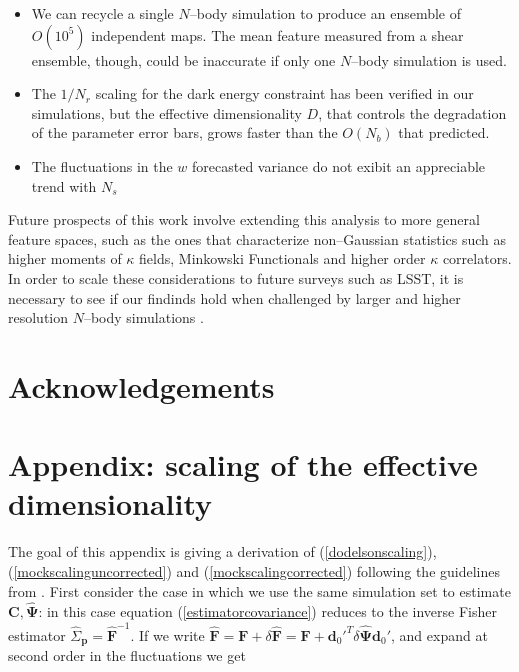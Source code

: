 \documentclass[reprint,aps,prd,superscriptaddress,showkeys,showpacs]{revtex4-1}
\newcommand{\bb}[1]{\mathbf{#1}}
\newcommand{\bbh}[1]{\mathbf{\hat{#1}}}
\newcommand{\h}[1]{\hat{#1}}
\begin{document}
\begin{itemize}
\item We can recycle a single $N$--body simulation to produce an ensemble of $O(10^5)$ independent maps. The mean feature measured from a shear ensemble, though, could be inaccurate if only one $N$--body simulation is used.  
\item The $1/N_r$ scaling for the dark energy constraint has been verified in our simulations, but the effective dimensionality $D$, that controls the degradation of the parameter error bars, grows faster than the $O(N_b)$ that \citep{DodelsonSchneider13} predicted. 
\item The fluctuations in the $w$ forecasted variance do not exibit an appreciable trend with $N_s$ 
\end{itemize}
%
Future prospects of this work involve extending this analysis to more general feature spaces, such as the ones that characterize non--Gaussian statistics such as higher moments of $\kappa$ fields, Minkowski Functionals and higher order $\kappa$ correlators. In order to scale these considerations to future surveys such as LSST, it is necessary to see if our findinds hold when challenged by larger and higher resolution $N$--body simulations \citep{Qcontinuum}.   

 

\section*{Acknowledgements}




\section*{Appendix: scaling of the effective dimensionality}
\label{appendix}

The goal of this appendix is giving a derivation of (\ref{dodelsonscaling}),(\ref{mockscalinguncorrected}) and (\ref{mockscalingcorrected}) following the guidelines from \citep{DodelsonSchneider13,Taylor12}. First consider the case in which we use the same simulation set to estimate $\bb{C},\bbh{\Psi}$: in this case equation (\ref{estimatorcovariance}) reduces to the inverse Fisher estimator $\h{\Sigma}_\bb{p}=\bbh{F}^{-1}$. If we write $\bbh{F}=\bb{F}+\delta\bbh{F}=\bb{F}+\bb{d}_0'^T\delta\bbh{\Psi}\bb{d}_0'$, and expand at second order in the fluctuations we get
\end{document}
